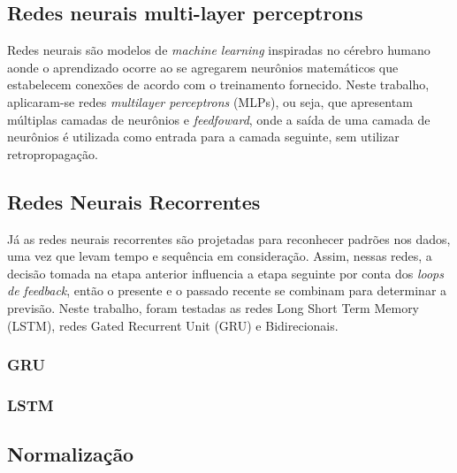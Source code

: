 \subsection{Redes neurais multi-layer perceptrons}
Redes neurais são modelos de \textit{machine learning} 
inspiradas no cérebro humano aonde o aprendizado ocorre 
ao se agregarem neurônios matemáticos que 
estabelecem conexões de acordo com o treinamento fornecido. 
Neste trabalho, aplicaram-se redes 
\textit{multilayer perceptrons} (MLPs), ou seja, que 
apresentam múltiplas camadas de neurônios 
e \textit{feedfoward}, onde a saída de 
uma camada de neurônios é utilizada como entrada para a camada seguinte, sem utilizar retropropagação.
          
        
\subsection{Redes Neurais Recorrentes}
  
Já as redes neurais recorrentes são projetadas para reconhecer padrões nos dados, uma vez que levam tempo e sequência em consideração. Assim, nessas redes, a decisão tomada na etapa anterior influencia a etapa seguinte por conta dos \textit{loops de feedback}, então o presente e o passado recente se combinam para determinar a previsão. Neste trabalho, foram testadas as redes Long Short Term Memory (LSTM), redes Gated Recurrent Unit (GRU) e Bidirecionais.
  
\subsubsection{GRU}

\subsubsection{LSTM}

\subsection{Normalização}